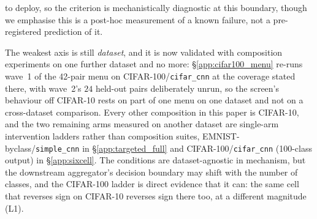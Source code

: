 \documentclass{article}
\begin{document}
to deploy, so the criterion is mechanistically diagnostic at this boundary, though we emphasise this is a post-hoc measurement of a known failure, not a pre-registered prediction of it.

The weakest axis is still \emph{dataset}, and it is now validated with composition experiments on one further dataset and no more: §\ref{app:cifar100_menu} re-runs wave~1 of the 42-pair menu on CIFAR-100/\texttt{cifar\_cnn} at the coverage stated there, with wave~2's $24$ held-out pairs deliberately unrun, so the screen's behaviour off CIFAR-10 rests on part of one menu on one dataset and not on a cross-dataset comparison. Every other composition in this paper is CIFAR-10, and the two remaining arms measured on another dataset are single-arm intervention ladders rather than composition suites, EMNIST-byclass/\texttt{simple\_cnn} in §\ref{app:targeted_full} and CIFAR-100/\texttt{cifar\_cnn} (100-class output) in §\ref{app:sixcell}. The conditions are dataset-agnostic in mechanism, but the downstream aggregator's decision boundary may shift with the number of classes, and the CIFAR-100 ladder is direct evidence that it can: the same cell that reverses sign on CIFAR-10 reverses sign there too, at a different magnitude (L1).




\end{document}
